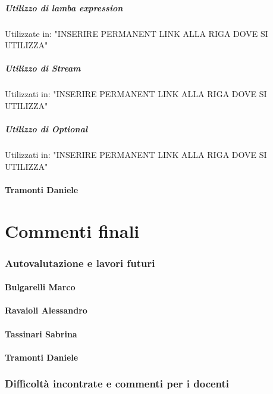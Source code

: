 \documentclass{report}
\begin{document}
\paragraph{Utilizzo di lamba expression}
Utilizzate in: "INSERIRE PERMANENT LINK ALLA RIGA DOVE SI UTILIZZA"

\paragraph{Utilizzo di Stream}
Utilizzati in: "INSERIRE PERMANENT LINK ALLA RIGA DOVE SI UTILIZZA"

\paragraph{Utilizzo di Optional}
Utilizzati in: "INSERIRE PERMANENT LINK ALLA RIGA DOVE SI UTILIZZA"

\subsubsection{Tramonti Daniele}

\chapter{Commenti finali}

\subsection{Autovalutazione e lavori futuri}

\subsubsection{Bulgarelli Marco}

\subsubsection{Ravaioli Alessandro}

\subsubsection{Tassinari Sabrina}


\subsubsection{Tramonti Daniele}

\subsection{Difficoltà incontrate e commenti per i docenti}
\end{document}
